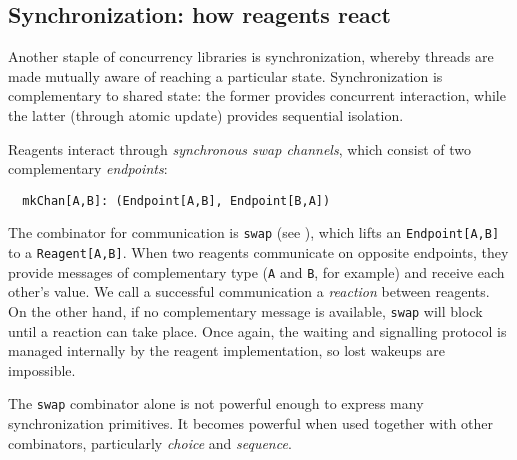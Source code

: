 \documentclass[preprint]{sigplanconf}
\begin{document}

\subsection{Synchronization: how reagents react}


Another staple of concurrency libraries is synchronization, whereby
threads are made mutually aware of reaching a particular state.
Synchronization is complementary to shared state: the former
provides concurrent interaction, while the latter (through atomic
update) provides sequential isolation.  %

Reagents interact through \emph{synchronous swap channels}, which
consist of two complementary \emph{endpoints}:
\begin{lstlisting}
  mkChan[A,B]: (Endpoint[A,B], Endpoint[B,A])
\end{lstlisting}
The combinator for communication is \lstinline{swap} (see
), which lifts an \lstinline{Endpoint[A,B]} to a
\lstinline{Reagent[A,B]}.  When two reagents communicate on opposite
endpoints, they provide messages of complementary type (\lstinline{A}
and \lstinline{B}, for example) and receive each other's value.  We
call a successful communication a \emph{reaction} between reagents.
On the other hand, if no complementary message is available,
\lstinline{swap} will block until a reaction can take place.  Once
again, the waiting and signalling protocol is managed internally by
the reagent implementation, so lost wakeups are impossible.

The \lstinline{swap} combinator alone is not powerful enough to
express many synchronization primitives.  It becomes powerful when
used together with other combinators, particularly \emph{choice} and
\emph{sequence}.

\end{document}

